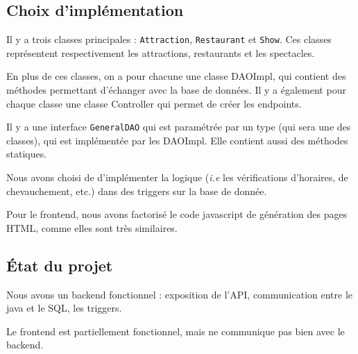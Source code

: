 \documentclass[a4paper, 12pt, twoside]{article}
\begin{document}
    \begin{indt}{\section{Choix d'implémentation}} %
        Il y a trois classes principales : \texttt{Attraction}, \texttt{Restaurant} et \texttt{Show}.
        Ces classes représentent respectivement les attractions, restaurants et les spectacles.

        En plus de ces classes, on a pour chacune une classe DAOImpl, qui contient des méthodes permettant d'échanger avec la base de données.
        Il y a également pour chaque classe une classe Controller qui permet de créer les endpoints.

        Il y a une interface \texttt{GeneralDAO} qui est paramétrée par un type (qui sera une des classes), qui est implémentée par les DAOImpl.
        Elle contient aussi des méthodes statiques.

        \vspace{12pt}
        
        Nous avons choisi de d'implémenter la logique (\textit{i.e} les vérifications d'horaires, de chevauchement, etc.) dans des triggers sur la base de donnée.

        \vspace{12pt}
        
        Pour le frontend, nous avons factorisé le code javascript de génération des pages HTML, comme elles sont très similaires.
    \end{indt} %

    \begin{indt}{\section{État du projet}} %
        Nous avons un backend fonctionnel : exposition de l'API, communication entre le java et le SQL, les triggers.

        Le frontend est partiellement fonctionnel, mais ne communique pas bien avec le backend.
    \end{indt} %
    
\end{document}
